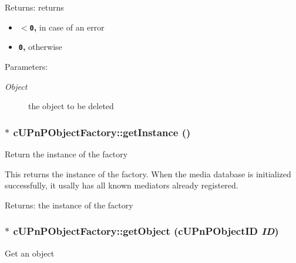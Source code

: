 \begin{Desc}
\item[Returns:]returns\begin{itemize}
\item {\bf {\tt $<$0},} in case of an error\item {\bf {\tt 0},} otherwise \end{itemize}
\end{Desc}
\begin{Desc}
\item[Parameters:]
\begin{description}
\item[{\em Object}]the object to be deleted \end{description}
\end{Desc}
 \hypertarget{classcUPnPObjectFactory_5b99e366dad18ab44ee1d2da5f1c3b4d}{
\subsubsection[{getInstance}]{ $\ast$ cUPnPObjectFactory::getInstance ()}}
\label{classcUPnPObjectFactory_5b99e366dad18ab44ee1d2da5f1c3b4d}


Return the instance of the factory

This returns the instance of the factory. When the media database is initialized successfully, it usally has all known mediators already registered.

\begin{Desc}
\item[Returns:]the instance of the factory \end{Desc}
\hypertarget{classcUPnPObjectFactory_a26f57549c26c6fc15425158e7fda4b6}{
\subsubsection[{getObject}]{ $\ast$ cUPnPObjectFactory::getObject ({\bf cUPnPObjectID} {\em ID})}}
\label{classcUPnPObjectFactory_a26f57549c26c6fc15425158e7fda4b6}


Get an object

